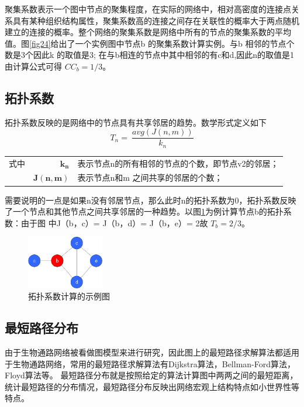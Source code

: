 聚集系数表示一个图中节点的聚集程度，在实际的网络中，相对高密度的连接点关系具有某种组织结构属性，聚集系数高的连接之间存在关联性的概率大于两点随机建立的连接的概率。整个网络的聚集系数是网络中所有的节点的聚集系数的平均值。图\ref{fig24}给出了一个实例图中节点b 的聚集系数计算实例。与b 相邻的节点个数是3个因此k 的取值是3; 在与b相连的节点中其中相邻的有c和d,因此n的取值是1由计算公式可得 $CC_{b}=1/3$。

\subsection{拓扑系数}
拓扑系数反映的是网络中的节点具有共享邻居的趋势。数学形式定义如下
\begin{equation}\label{eq25}
	T_{n} =\ \frac{avg( J( n,m))}{k_{n}}
\end{equation}
\begin{tabularx}{\textwidth}{@{}l@{\quad}r@{———}X@{}}
式中 & $\boldsymbol{k_{n}}$ &  表示节点n的所有相邻的节点的个数，即节点v2的邻居；\\
	& $\boldsymbol{ J( n,m)}$ &   表示节点n和m  之间共享的邻居的个数；\\
\end{tabularx}\vspace{3.15bp}
需要说明的一点是如果n没有邻居节点，那么此时n的拓扑系数为0，拓扑系数反映了一个节点和其他节点之间共享邻居的一种趋势。以图\ref{fig25}为例计算节点b的拓扑系数：由于图 中J（b，c）= J（b，d）= J（b，e）= 2故 $T_{b}=2/3$。
\begin{figure}
\centering
\includegraphics[width = 0.3\textwidth]{toplog}
\caption[fig25]{拓扑系数计算的示例图}
\label{fig25}
\end{figure}
\subsection{最短路径分布}
由于生物通路网络被看做图模型来进行研究，因此图上的最短路径求解算法都适用于生物通路网络，常用的最短路径求解算法有Dijkstra\cite{}算法，Bellman-Ford\cite{}算法，Floyd\cite{}算法等。
最短路径分布就是按照给定的算法计算图中两两之间的最短距离，统计最短路径的分布情况，最短路径分布反映出网络宏观上结构特点如小世界性等特点\cite{Article Navigation
Computing topological parameters of biological networks}。

